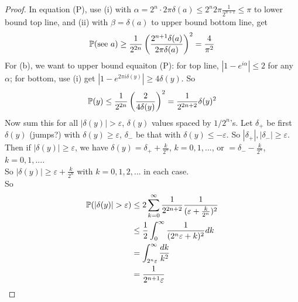 \documentclass[a4paper]{article}
\begin{document}
\begin{thm}
\begin{proof}
        In equation (P), use (i) with $\alpha =2^n \cdot 2\pi \delta(a) \leq 2^n 2\pi \frac{1}{2^{n+1}} \leq \pi$ to lower bound top line, and (ii) with $\beta = \delta(a)$ to upper bound bottom line, get
        \begin{equation*}
            \begin{aligned}
                \P(\text{see } a) \geq \frac{1}{2^{2n}} \left(\frac{2^{n+1}\delta(a)}{2\pi \delta(a)}\right)^2 = \frac{4}{\pi^2}
            \end{aligned}
        \end{equation*}
        For (b), we want to upper bound equaiton (P): for top line, $|1-e^{i\alpha}| \leq 2$ for any $\alpha$; for bottom, use (i) get $|1-e^{2\pi i\delta(y)} | \geq 4\delta(y)$. So
        \begin{equation*}
            \begin{aligned}
                \P(y) \leq \frac{1}{2^{2n}} \left(\frac{2}{4\delta(y)}\right)^2 = \frac{1}{2^{2n+2}} \delta(y)^2
            \end{aligned}
        \end{equation*}
        Now sum this for all $|\delta(y)| > \varepsilon$, $\delta(y)$ values spaced by $1/2^n$'s. Let $\delta_+$ be first $\delta(y)$ (jumps?) with $\delta(y) \geq \varepsilon$, $\delta_-$ be that with $\delta(y) \leq -\varepsilon$. So $|\delta_+|,|\delta_-| \geq \varepsilon$.\\
        Then if $|\delta(y)| \geq \varepsilon$, we have $\delta(y) = \delta_+ + \frac{k}{2^n}$, $k=0,1,...$, or $=\delta_- - \frac{k}{2^n}$, $k=0,1,...$.\\
        So $|\delta(y)| \geq \varepsilon + \frac{k}{2^n}$ with $k=0,1,2,...$ in each case.\\
        So
        \begin{equation*}
            \begin{aligned}
                \P(|\delta(y)| > \varepsilon) &\leq 2 \sum_{k=0}^\infty \frac{1}{2^{2n+2}} \frac{1}{(\varepsilon+\frac{k}{2^n})^2}\\
                &\leq \frac{1}{2} \int_0^\infty \frac{1}{(2^n \varepsilon+k)^2} dk\\
                &= \int_{2^n \varepsilon}^\infty \frac{dk}{k^2}\\
                &= \frac{1}{2^{n+1} \varepsilon}
            \end{aligned}
        \end{equation*}
    \end{proof}
\end{thm}
\end{document}
